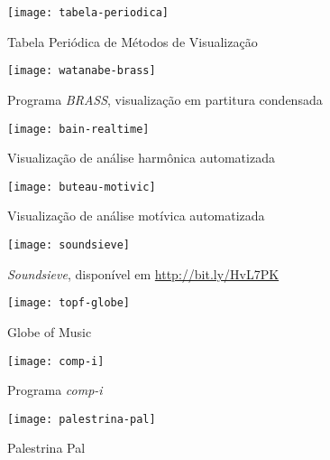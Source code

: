 \documentclass{sciposter}
\begin{document}
\begin{multicols}{2}

\begin{figure}
  \centering
  \texttt{[image: tabela-periodica]}
  \caption{Tabela Periódica de Métodos de Visualização \cite{Lengler2007}}
  \label{fig:tabela-periodica}
\end{figure}

\begin{figure}
  \centering
  \texttt{[image: watanabe-brass]}
  \caption{Programa \textit{BRASS}, visualização em partitura condensada \cite{Watanabe2003}}
  \label{fig:watanabe-brass}
\end{figure}

\begin{figure}
  \centering
  \texttt{[image: bain-realtime]}
  \caption{Visualização de análise harmônica automatizada \cite{Bain2008}}
  \label{fig:bain-realtime}
\end{figure}

\begin{figure}
  \centering
  \texttt{[image: buteau-motivic]}
  \caption{Visualização de análise motívica automatizada \cite{Buteau2005}}
  \label{fig:buteau-motivic}
\end{figure}

\begin{figure}
  \centering
  \texttt{[image: soundsieve]}
  \caption{\textit{Soundsieve}, disponível em \url{http://bit.ly/HvL7PK}}
  \label{fig:soundsieve}
\end{figure}

\begin{figure}
  \centering
  \texttt{[image: topf-globe]}
  \caption{Globe of Music \cite{Leitich2007}}
  \label{fig:topf-globe}
\end{figure}

\begin{figure}
  \centering
  \texttt{[image: comp-i]}
  \caption{Programa \textit{comp-i} \cite{Miyazaki2004}}
  \label{fig:comp-i}
\end{figure}

\begin{figure}
  \centering
  \texttt{[image: palestrina-pal]}
  \caption{Palestrina Pal \cite{Gramit2005}}
  \label{fig:palestrina-pal}
\end{figure}

\end{multicols}
\end{document}
